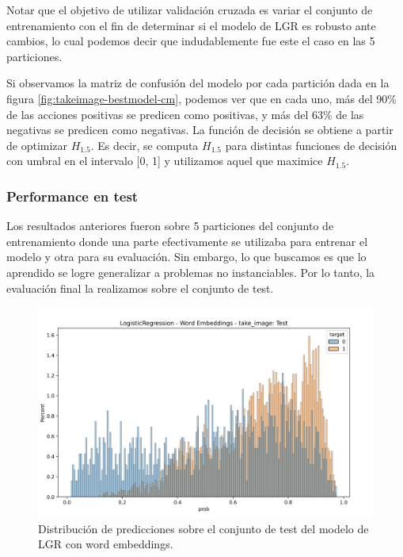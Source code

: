 Notar que el objetivo de utilizar validación cruzada es variar el conjunto de
entrenamiento con el fin de determinar si el modelo de LGR es robusto ante
cambios, lo cual podemos decir que indudablemente fue este el caso en las 5
particiones.

Si observamos la matriz de confusión del modelo por cada partición dada en la
figura \ref{fig:takeimage-bestmodel-cm}, podemos ver que en cada uno, más del
90\% de las acciones positivas se predicen como positivas, y más del 63\% de las
negativas se predicen como negativas. La función de decisión se obtiene a partir
de optimizar $H_{1.5}$. Es decir, se computa $H_{1.5}$ para distintas funciones
de decisión con umbral en el intervalo [0, 1] y utilizamos aquel que maximice
$H_{1.5}$. 

\subsubsection{Performance en test}

Los resultados anteriores fueron sobre 5 particiones del conjunto de
entrenamiento donde una parte efectivamente se utilizaba para entrenar el modelo
y otra para su evaluación. Sin embargo, lo que buscamos es que lo aprendido se
logre generalizar a problemas no instanciables. Por lo tanto, la evaluación
final la realizamos sobre el conjunto de test.

\begin{figure}[t!]
    \centering
    \includegraphics[width=0.7\linewidth]{figures/results/word_embeddings/lgr/take_image/lgr_wb_take_image_test.png}
    \caption{Distribución de predicciones sobre el conjunto de test del modelo de LGR con word embeddings.}
    \label{fig:takeimage-bestmodel-distplot-test}
\end{figure}

